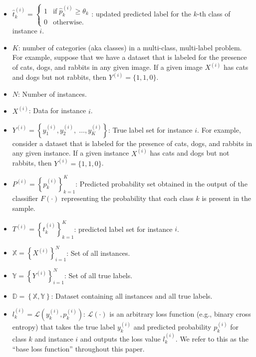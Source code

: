 \documentclass[authoryear,preprint,review,12pt]{elsarticle}
\begin{document}
\begin{itemize}
    \item  $\widehat{t}_k^{(i)}=\left\{\begin{array}{ll}1&\text{if}\;\widehat{p}_k^{(i)}\geq\theta_k\\0&\text{otherwise.}\end{array}\right. $: updated predicted label for the $k $-th class of instance $i $.
    \item $K $: number of categories (aka classes) in a multi-class, multi-label problem. For example, suppose that we have a dataset that is labeled for the presence of cats, dogs, and rabbits in any given image. If a given image $X^{(i)} $ has cats and dogs but not rabbits, then $Y^{(i)} = \{1,1,0\} $.
    \item  $N $: Number of instances.
    \item $X^{(i)} $: Data for instance $i$.
    \item     $Y^{(i)}=\left\{y_1^{(i)},y_2^{(i)},\;\dots,y_{K}^{(i)}\right\} $: True label set for instance $i $. For example, consider a dataset that is labeled for the presence of cats, dogs, and rabbits in any given instance. If a given instance $X^{(i)} $ has cats and dogs but not rabbits, then $Y^{(i)}=\{1,1,0\} $.
    \item     $P^{(i)} = {\left\{ p_k^{(i)} \right\}}_{k=1}^{K} $: Predicted probability set obtained in the output of the classifier $F(\cdot) $ representing the probability that each class $k $ is present in the sample.
    \item  $T^{(i)} = {\left\{t_k^{(i)}\right\}}_{k=1}^{K} $: predicted label set for instance $i $.
    \item  $\mathbb{X} = {\left\{X^{(i)}\right\}}_{i=1}^{N} $: Set of all instances.
    \item  $\mathbb{Y} = {\left\{Y^{(i)}\right\}}_{i=1}^{N} $: Set of all true labels.
    \item $\mathbb{D}=\left\{\mathbb{X},\mathbb{Y}\right\} $: Dataset containing all instances and all true labels.
    \item  $l_k^{(i)} = \mathcal{L} \left(y_k^{(i)},p_k^{(i)}\right) $:  $\mathcal{L}(\cdot)$ is an arbitrary loss function (e.g., binary cross entropy) that takes the true label $y_k^{(i)}$ and predicted probability $p_k^{(i)}$ for class $k$ and instance $i$ and outputs the loss value $l_k^{(i)} $. We refer to this as the ``base loss function'' throughout this paper.

\end{itemize}
\end{document}
